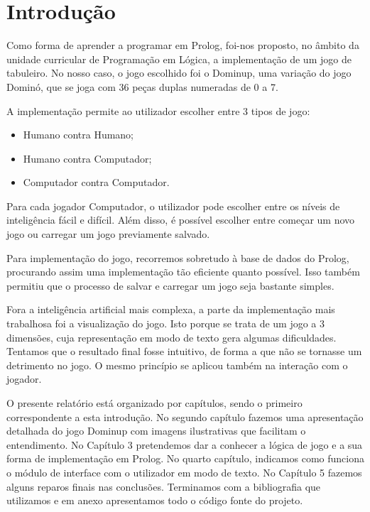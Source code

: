 \documentclass[a4paper]{article}
\begin{document}
\section{Introdução}

Como forma de aprender a programar em Prolog, foi-nos proposto, no âmbito da unidade curricular de Programação em Lógica, a implementação de um jogo de tabuleiro. No nosso caso, o jogo escolhido foi o Dominup, uma variação do jogo Dominó, que se joga com 36 peças duplas numeradas de 0 a 7.

A implementação permite ao utilizador escolher entre 3 tipos de jogo:
\begin{itemize}
	\item Humano contra Humano;
	\item Humano contra Computador;
	\item Computador contra Computador.
\end{itemize}

Para cada jogador Computador, o utilizador pode escolher entre os níveis de inteligência fácil e difícil. Além disso, é possível escolher entre começar um novo jogo ou carregar um jogo previamente salvado.

Para implementação do jogo, recorremos sobretudo à base de dados do Prolog, procurando assim uma implementação tão eficiente quanto possível. Isso também permitiu que o processo de salvar e carregar um jogo seja bastante simples.

Fora a inteligência artificial mais complexa, a parte da implementação mais trabalhosa foi a visualização do jogo. Isto porque se trata de um jogo a 3 dimensões, cuja representação em modo de texto gera algumas dificuldades. Tentamos que o resultado final fosse intuitivo, de forma a que não se tornasse um detrimento no jogo. O mesmo princípio se aplicou também na interação com o jogador.

O presente relatório está organizado por capítulos, sendo o primeiro correspondente a esta introdução. No segundo capítulo fazemos uma apresentação detalhada do jogo Dominup com imagens ilustrativas que facilitam o entendimento. No Capítulo 3 pretendemos dar a conhecer a lógica de jogo e a sua forma de implementação em Prolog. No quarto capítulo, indicamos como funciona o módulo de interface com o utilizador em modo de texto. No Capítulo 5 fazemos alguns reparos finais nas conclusões. Terminamos com a bibliografia que utilizamos e em anexo apresentamos todo o código fonte do projeto.
\end{document}

